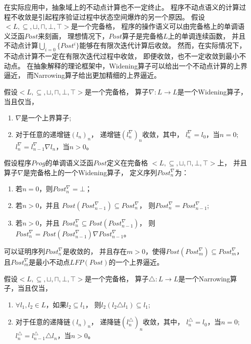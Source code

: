 在实际应用中，抽象域上的不动点计算也不一定终止。
程序不动点语义的计算过程不收敛是引起程序验证过程中状态空间爆炸的另一个原因。
假设$<L,\subseteq, \sqcup, \sqcap, \bot,\top>$是一个完备格，
程序的操作语义可以由完备格上的单调语义泛函$Post$来刻画，
理想情况下，$Post$算子是完备格$L$上的单调连续函数，
并且不动点计算$\bigcup_{i=0}\{Post^{i}\}$能够在有限次迭代计算后收敛。
然而，在实际情况下，不动点计算不一定在有限次迭代过程中收敛，
即便收敛，也不一定收敛到最小不动点。
在抽象解释的理论框架中，Widening算子可以给出一个不动点计算的上界逼近，
而Narrowing算子给出更加精细的上界逼近。

\begin{definition}[Widening算子]
假设$<L,\subseteq, \sqcup, \sqcap, \bot,\top>$是一个完备格，
算子$\nabla: L \rightarrow L$是一个Widening算子，当且仅当，
\begin{enumerate}
\item $\nabla$是一个上界算子;
\item 对于任意的递增链$(l_n)_n$，
递增链$(l_{n}^{\nabla})_n$收敛，其中，
$l_{n}^{\nabla} = l_0$，当$n=0$;
 $l_{n}^{\nabla} = l_{n-1}^{\nabla} \nabla l_n$，当$n>0$。
\end{enumerate}
\end{definition}

假设程序$Prog$的单调语义泛函$Post$定义在完备格
$<L,\subseteq, \sqcup, \sqcap, \bot,\top>$上，
并且算子$\nabla$是完备格上的一个Widening算子，
定义序列$Post_{n}^{\nabla}$为：

\begin{enumerate}
\item 若$n=0$，则$Post_{n}^{\nabla} = \bot$；
\item 若$n > 0$，并且
$Post(Post_{n-1}^{\nabla}) \subseteq Post_{n}^{\nabla}$，
则$Post_{n}^{\nabla} = Post_{n-1}^{\nabla}$;
\item 若$n > 0$，并且
$Post_{n}^{\nabla} \subseteq Post(Post_{n-1}^{\nabla})$，
则$Post_{n}^{\nabla} = Post(Post_{n-1}^{\nabla}) \nabla  Post_{n-1}^{\nabla}$。
\end{enumerate}

可以证明序列$Post_{n}^{\nabla}$是收敛的，
并且存在$m > 0$，使得$Post(Post_{m}^{\nabla}) \subseteq Post_{m}^{\nabla}$，
且$Post_{m}^{\nabla}$是最小不动点$LFP(Post)$的一个上界逼近。

\begin{definition}[Narrowing算子]
假设$<L,\subseteq, \sqcup, \sqcap, \bot,\top>$是一个完备格，
算子$\triangle: L \rightarrow L$是一个Narrowing算子，当且仅当，
\begin{enumerate}
\item $\forall l_1,l_2 \in L$，如果$l_2 \subseteq l_1$，
	则$l_2 (l_2\triangle l_1) \subseteq l_1$;
\item 对于任意的递降链$(l_n)_n$，
	递降链$(l_{n}^{\triangle})_n$收敛，其中，
	$l_{n}^{\triangle} = l_0$，当$n=0$;
	$l_{n}^{\triangle} = l_{n-1}^{\triangle} \triangle l_n$，当$n>0$。
\end{enumerate}
\end{definition}

